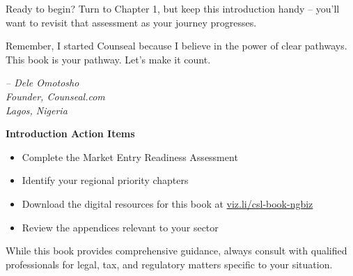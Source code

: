 Ready to begin? Turn to Chapter 1, but keep this introduction handy – you'll want to revisit that assessment as your journey progresses.

Remember, I started Counseal because I believe in the power of clear pathways. This book is your pathway. Let's make it count.

\begin{flushright}
\textit{-- Dele Omotosho\\
Founder, Counseal.com\\
Lagos, Nigeria}
\end{flushright}

\begin{workshopbox}
\textbf{Introduction Action Items}
\begin{itemize}
    \item Complete the Market Entry Readiness Assessment
    \item Identify your regional priority chapters
    \item Download the digital resources for this book at \href{https://viz.li/csl-book-ngbiz}{viz.li/csl-book-ngbiz}
    \item Review the appendices relevant to your sector
\end{itemize}
\end{workshopbox}

\begin{warningbox}
While this book provides comprehensive guidance, always consult with qualified professionals for legal, tax, and regulatory matters specific to your situation.
\end{warningbox}